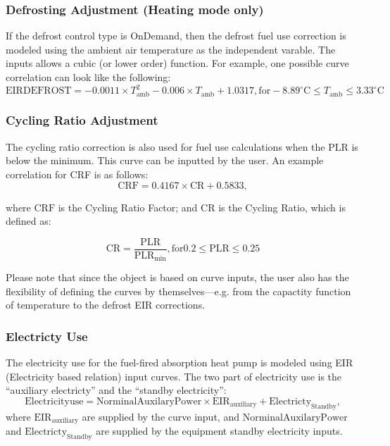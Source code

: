 \subsubsection{Defrosting Adjustment (Heating mode only)}
If the defrost control type is OnDemand, then the defrost fuel use correction is modeled using the ambient air temperature as the independent varable. The inputs allows a cubic (or lower order) function. For example, one possible curve correlation can look like the following:  
\begin{equation}
\mathrm{EIRDEFROST} = -0.0011 \times T_{\mathrm{amb}}^{2} - 0.006 \times T_{\mathrm{amb}} + 1.0317, \mathrm{for} -8.89^{\circ}\mathrm{C} \leq T_{\mathrm{amb}} \leq 3.33^{\circ}\mathrm{C} 
\end{equation}

\subsubsection{Cycling Ratio Adjustment}
The cycling ratio correction is also used for fuel use calculations when the PLR is below the minimum. This curve can be inputted by the user. An example correlation for CRF is as follows: 
\begin{equation}
\mathrm{CRF} = 0.4167 \times \mathrm{CR} + 0.5833,
\end{equation}

where $\mathrm{CRF}$ is the Cycling Ratio Factor; and $\mathrm{CR}$ is the Cycling Ratio, which is defined as: 

\begin{equation}
\mathrm{CR} = \frac{\mathrm{PLR}}{\mathrm{PLR}_{\mathrm{min}}}, \mathrm{for} 0.2 \leq \mathrm{PLR} \leq 0.25
\end{equation}

Please note that since the object is based on curve inputs, the user also has the flexibility of defining the curves by themselves---e.g. from the capactity function of temperature to the defrost EIR corrections. 

\subsubsection{Electricty Use}

The electricity use for the fuel-fired absorption heat pump is modeled using EIR (Electricity based relation) input curves. The two part of electricity use is the ``auxiliary electricty'' and the ``standby electricity'':
\begin{equation}
\mathrm{Electricity use} = \mathrm{Norminal Auxilary Power} \times \mathrm{EIR}_{\mathrm{auxiliary}} + \mathrm{Electricty}_{\mathrm{Standby}},
\end{equation}
where $\mathrm{EIR}_{\mathrm{auxiliary}}$ are supplied by the curve input, and $\mathrm{Norminal Auxilary Power}$ and $\mathrm{Electricty}_{\mathrm{Standby}}$ are supplied by the equipment standby electricity inputs. 
